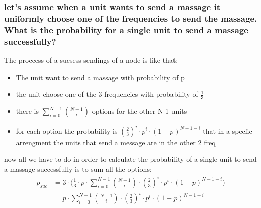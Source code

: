 \documentclass{article}
\begin{document}
\subsubsection{let's assume when a unit wants to send a massage it uniformly choose one of the frequencies to send the massage.
What is the probability for a single unit to send a massage successfully?}
The proccess of a sucsess sendings of a node is like that:
\begin{itemize}
    \item The unit want to send a massage with probability of p
    \item the unit choose one of the 3 frequencies with probability of $\frac13$
    \item there is $\sum^{N-1}_{i=0} \binom{N-1}{i}$ options for the other N-1 units 
    \item for each option the probability is $(\frac23)^{i}\cdot p^{i} \cdot (1-p)^{N-1-i}$ that in a specfic arrengment the units
          that send a message are in the other 2 freq
\end{itemize}
now all we have to do in order to calculate the probability of a single unit to send a massage successfully is to sum all the options:
\begin{equation}
    \begin{aligned}
        p_{suc} &= 3\cdot\bigg(\frac13 \cdot p\cdot \sum^{N-1}_{i=0} \binom{N-1}{i} \cdot (\frac23)^{i}\cdot p^{i} \cdot (1-p)^{N-1-i}\bigg)\\
        &= p\cdot \sum^{N-1}_{i=0} \binom{N-1}{i} \cdot (\frac23)^{i}\cdot p^{i} \cdot (1-p)^{N-1-i}\\
    \end{aligned}
\end{equation}
\end{document}
